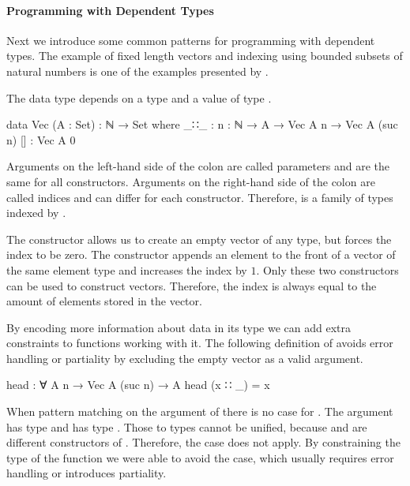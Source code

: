 \paragraph{Programming with Dependent Types}

Next we introduce some common patterns for programming with dependent types.
The example of fixed length vectors and indexing using bounded subsets of
natural numbers is one of the examples presented by
\textcite{DBLP:conf/afp/Norell08}.

The data type  depends on a type  and a value
of type .

\begin{code}
data Vec (A : Set) : ℕ → Set where
  _∷_  : {n : ℕ} → A → Vec A n → Vec A (suc n)
  []   : Vec A 0
\end{code}
Arguments on the left-hand side of the colon are called parameters and are the
same for all constructors.
Arguments on the right-hand side of the colon are called indices and can differ
for each constructor.
Therefore, \AgdaSpace{} is a family of types
indexed by .

The \AgdaInductiveConstructor{[]} constructor allows us to create an empty
vector of any type, but forces the index to be zero.
The  constructor appends an element to the front
of a vector of the same element type and increases the index by $1$.
Only these two constructors can be used to construct vectors.
Therefore, the index is always equal to the amount of elements stored in the
vector.

By encoding more information about data in its type we can add extra constraints
to functions working with it.
The following definition of  avoids error handling or
partiality by excluding the empty vector as a valid argument.

\begin{code}
head : ∀ {A n} → Vec A (suc n) → A
head (x ∷ _) = x
\end{code}
When pattern matching on the argument of  there is no case
for \AgdaInductiveConstructor{[]}.
The argument has type  and
\AgdaInductiveConstructor{[]} has type .
Those to types cannot be unified, because  and
 are different constructors of .
Therefore, the \AgdaInductiveConstructor{[]} case does not apply.
By constraining the type of the function we were able to avoid the case, which
usually requires error handling or introduces partiality.

